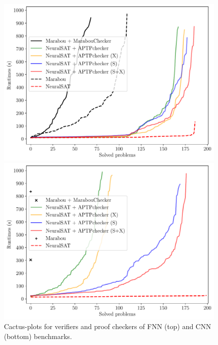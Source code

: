 \documentclass[oneside,11pt,dvipsnames]{book}
\begin{document}
\begin{figure}[t]
    \centering
    \begin{minipage}[t]{0.4\textwidth}
        \centering  
        \includegraphics[width=\linewidth]{figure/fnn.pdf}
    \end{minipage}
    \begin{minipage}[t]{0.4\textwidth}
        \centering  
        \includegraphics[width=\linewidth]{figure/cnn.pdf}
    \end{minipage}

    \caption{Cactus-plots for verifiers and proof checkers of FNN (top) and CNN (bottom) benchmarks.}
    \label{fig:cactus-plots}
\end{figure}
\end{document}
